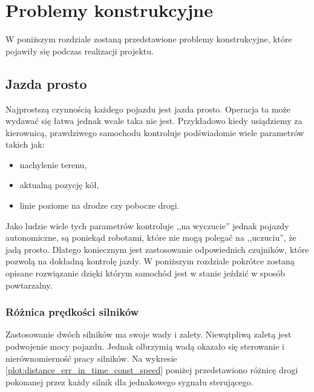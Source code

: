 \section{Problemy konstrukcyjne}
\label{sec:problemy_konstrukcyjne}
    W poniższym rozdziale zostaną przedstawione problemy konstrukcyjne,
    które pojawiły się podczas realizacji projektu.

    \subsection{Jazda prosto}
    \label{section:jazda_prosto}
        Najprostszą czynnością każdego pojazdu jest jazda prosto.
        Operacja ta może wydawać się łatwa jednak wcale taka nie jest.
        Przykładowo kiedy usiądziemy za kierownicą, prawdziwego samochodu kontroluje podświadomie wiele parametrów takich jak:
        \begin{itemize}
            \item nachylenie terenu,
            \item aktualną pozycję kół,
            \item linie poziome na drodze czy pobocze drogi.
        \end{itemize}
        Jako ludzie wiele tych parametrów kontroluje ,,na wyczucie'' jednak pojazdy autonomiczne, są poniekąd robotami, które nie mogą polegać na ,,uczuciu'', że jadą prosto.
        Dlatego koniecznym jest zastosowanie odpowiednich czujników, które pozwolą na dokładną kontrolę jazdy.
        W poniższym rozdziale pokrótce zostaną opisane rozwiązanie dzięki którym samochód jest w stanie jeździć w sposób powtarzalny.

        \subsubsection{Różnica prędkości silników}
            Zastosowanie dwóch silników ma swoje wady i zalety.
            Niewątpliwą zaletą jest podwojenie mocy pojazdu.
            Jednak olbrzymią wadą okazało się sterowanie i nierównomierność pracy silników.
            Na wykresie \ref{plot:distance_err_in_time_const_speed} poniżej przedstawiono różnicę drogi pokonanej przez każdy silnik dla jednakowego sygnału sterującego.

